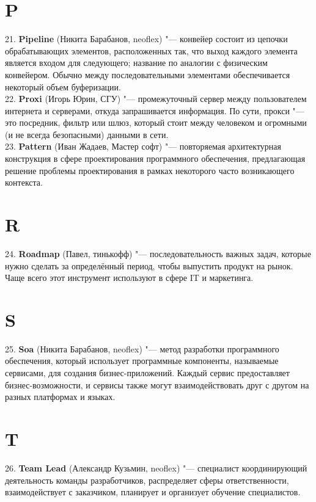 \documentclass[14 pt]{extarticle}
\begin{document}
\section*{P}
    21. \textbf{Pipeline} (Никита Барабанов, neoflex) "--- конвейер состоит из цепочки обрабатывающих элементов, расположенных так, что выход каждого элемента является входом для следующего; название по аналогии с физическим конвейером. Обычно между последовательными элементами обеспечивается некоторый объем буферизации. \\
    
    22. \textbf{Proxi} (Игорь Юрин, СГУ) "--- промежуточный сервер между пользователем интернета и серверами, откуда запрашивается информация. По сути, прокси "--- это посредник, фильтр или шлюз, который стоит между человеком и огромными (и не всегда безопасными) данными в сети. \\
    
    23. \textbf{Pattern} (Иван Жадаев, Мастер софт) "--- повторяемая архитектурная конструкция в сфере проектирования программного обеспечения, предлагающая решение проблемы проектирования в рамках некоторого часто возникающего контекста. \\
    
\section*{R}
    24. \textbf{Roadmap} (Павел, тинькофф) "--- последовательность важных задач, которые нужно сделать за определённый период, чтобы выпустить продукт на рынок. Чаще всего этот инструмент используют в сфере IT и маркетинга. \\
    
\section*{S}
    25. \textbf{Soa} (Никита Барабанов, neoflex) "--- метод разработки программного обеспечения, который использует программные компоненты, называемые сервисами, для создания бизнес-приложений. Каждый сервис предоставляет бизнес-возможности, и сервисы также могут взаимодействовать друг с другом на разных платформах и языках. \\
    
\section*{T}
    26. \textbf{Team Lead} (Александр Кузьмин, neoflex) "--- специалист координирующий деятельность команды разработчиков, распределяет сферы ответственности, взаимодействует с заказчиком, планирует и организует обучение специалистов. \\
    
\end{document}

